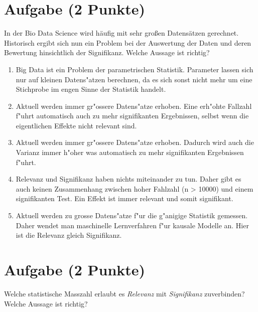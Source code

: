 \documentclass[a4paper, 10pt]{scrartcl}\usepackage[]{graphicx}\usepackage[]{xcolor}
\begin{document}
\section{Aufgabe \hfill (2 Punkte)}

In der Bio Data Science wird h{\"a}ufig mit sehr gro{\ss}en Datens{\"a}tzen
gerechnet. Historisch ergibt sich nun ein Problem bei der Auswertung der
Daten und deren Bewertung hinsichtlich der Signifikanz. Welche Aussage ist richtig?



\begin{enumerate}
\item [\textbf{A} \msquare] Big Data ist ein Problem der parametrischen Statistik. Parameter lassen sich nur auf kleinen Datens{"a}tzen berechnen, da es sich sonst nicht mehr um eine Stichprobe im engen Sinne der Statistik handelt.
\item [\textbf{B} \msquare] Aktuell werden immer gr{"o}ssere Datens{"a}tze erhoben. Eine erh{"o}hte Fallzahl f{"u}hrt automatisch auch zu mehr signifikanten Ergebnissen, selbst wenn die eigentlichen Effekte nicht relevant sind.
\item [\textbf{C} \msquare] Aktuell werden immer gr{"o}ssere Datens{"a}tze erhoben. Dadurch wird auch die Varianz immer h{"o}her was automatisch zu mehr signifikanten Ergebnissen f{"u}hrt.
\item [\textbf{D} \msquare] Relevanz und Signifikanz haben nichts miteinander zu tun. Daher gibt es auch keinen Zusammenhang zwischen hoher Fahlzahl (n > 10000) und einem signifikanten Test. Ein Effekt ist immer relevant und somit signifikant.
\item [\textbf{E} \msquare] Aktuell werden zu grosse Datens{"a}tze f{"u}r die g{"a}nigige Statistik gemessen. Daher wendet man maschinelle Lernverfahren f{"u}r kausale Modelle an. Hier ist die Relevanz gleich Signifikanz.
\end{enumerate}

\section{Aufgabe \hfill (2 Punkte)}

Welche statistische Masszahl erlaubt es \textit{Relevanz} mit
\textit{Signifikanz} zuverbinden? Welche Aussage ist richtig?
\end{document}
